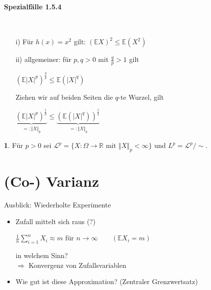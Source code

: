 \documentclass[10pt,a4paper]{report}
\numberwithin{equation}{section}
\numberwithin{figure}{section}
\theoremstyle{plain}
\theoremstyle{definition}
\newtheorem{defn}[thm]{\protect\definitionname}
\theoremstyle{remark}
\theoremstyle{plain}
\providecommand{\definitionname}{Definition}
\newcommand{\1}{ \mathbb{1} } %
\begin{document}
\paragraph{Spezialfälle 1.5.4} \ 
\begin{itemize}
\item[i)] Für $h(x)=x^2$ gilt: $(\mathbb{E}X)^2\leq \mathbb{E}(X^2)$
\item[ii)] allgemeiner: für $p,q>0$ mit $\frac{q}{p}>1$ gilt
  \begin{center}
    $(\mathbb{E}|X|^p)^\frac{q}{p} \leq \mathbb{E}(|X|^q)$
  \end{center} 
  Ziehen wir auf beiden Seiten die $q$-te Wurzel, gilt
  \begin{center}
    $\underbrace{(\mathbb{E}|X|^p)^\frac{1}{p}}_{=:\Vert X\Vert_p}\leq\underbrace{(\mathbb{E}(|X|^q))^\frac{1}{q}}_{=:\Vert X\Vert_q}$ 
  \end{center}
\end{itemize}
\begin{defn}  %
  Für $p>0$ sei $\mathcal{L}^p=\{X:\Omega \to \mathbb{R}$ mit $\Vert X\Vert_p<\infty\}$ und $L^p=\mathcal{L}^p/\sim$.
\end{defn}

\section{(Co-) Varianz}
\label{sec:varianz}

Ausblick: Wiederholte Experimente
\begin{itemize}
\item Zufall mittelt sich raus (?)
  \begin{center}
    $\frac{1}{n}\sum\limits_{i=1}^nX_i\approx m$ für $ n\to \infty
    \qquad (\mathbb{E}X_i=m)$
  \end{center}
  in welchem Sinn?\\
  $\Rightarrow$ Konvergenz von Zufallsvariablen
\item Wie gut ist diese Approximation? (Zentraler Grenzwertsatz)
\end{itemize}
\end{document}
